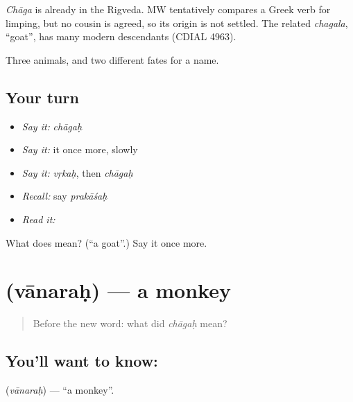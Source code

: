 \begin{cousinweb}
\emph{Chāga} is already in the Rigveda. MW tentatively compares a Greek verb for limping, but no cousin is agreed, so its origin is not settled. The related \emph{chagala}, \textquotedblleft{}goat\textquotedblright{}, has many modern descendants (CDIAL 4963).
\end{cousinweb}

\begin{grammarlens}[title={What you've built}]
Three animals, and two different fates for a name.
\end{grammarlens}

\subsection*{Your turn}
\begin{itemize}
\raggedright
  \item \emph{Say it:} \emph{chāgaḥ}
  \item \emph{Say it:} it once more, slowly
  \item \emph{Say it:} \emph{vṛkaḥ}, then \emph{chāgaḥ}
  \item \emph{Recall:} say \emph{prakāśaḥ}
  \item \emph{Read it:} \textbf{}
\end{itemize}

\begin{tcolorbox}[breakable,colback=teal!4,colframe=teal!35!black,title={Before you move on}]
What does  mean? (\textquotedblleft{}a goat\textquotedblright{}.) Say it once more.
\end{tcolorbox}
\section[\texorpdfstring{\sk{वानरः} (vānaraḥ)}{वानरः (vānaraḥ)}]{ (vānaraḥ) — a monkey}

\label{lesson:SA-C48-monkey}



\begin{quote}
Before the new word: what did \emph{chāgaḥ} mean?
\end{quote}

\subsection*{You'll want to know: }
\textbf{} (\emph{vānaraḥ}) — \textquotedblleft{}a monkey\textquotedblright{}.

